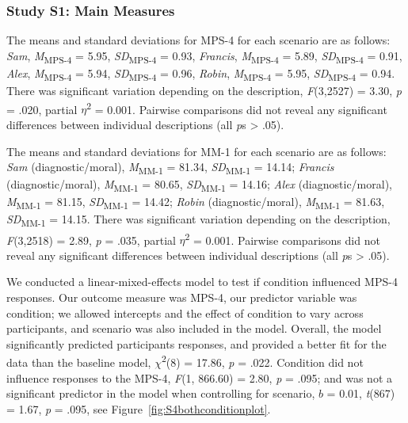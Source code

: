 \documentclass[
  man,floatsintext]{apa6}
\begin{document}
\subsubsection{Study S1: Main Measures}\label{study-s1-main-measures}

The means and standard deviations for MPS-4 for each scenario are as follows:
\emph{Sam},
\emph{M}\textsubscript{MPS-4} = 5.95, \emph{SD}\textsubscript{MPS-4} = 0.93,
\emph{Francis},
\emph{M}\textsubscript{MPS-4} = 5.89, \emph{SD}\textsubscript{MPS-4} = 0.91,
\emph{Alex},
\emph{M}\textsubscript{MPS-4} = 5.94, \emph{SD}\textsubscript{MPS-4} = 0.96,
\emph{Robin},
\emph{M}\textsubscript{MPS-4} = 5.95, \emph{SD}\textsubscript{MPS-4} = 0.94. There was significant variation depending on the description, \emph{F}(3,2527) = 3.30, \emph{p} = .020, partial \(\eta\)\textsuperscript{2} = 0.001. Pairwise comparisons did not reveal any significant differences between individual descriptions (all \emph{p}s \textgreater{} .05).

The means and standard deviations for MM-1 for each scenario are as follows:
\emph{Sam} (diagnostic/moral),
\emph{M}\textsubscript{MM-1} = 81.34, \emph{SD}\textsubscript{MM-1} = 14.14;
\emph{Francis} (diagnostic/moral),
\emph{M}\textsubscript{MM-1} = 80.65, \emph{SD}\textsubscript{MM-1} = 14.16;
\emph{Alex} (diagnostic/moral),
\emph{M}\textsubscript{MM-1} = 81.15, \emph{SD}\textsubscript{MM-1} = 14.42;
\emph{Robin} (diagnostic/moral),
\emph{M}\textsubscript{MM-1} = 81.63, \emph{SD}\textsubscript{MM-1} = 14.15. There was significant variation depending on the description, \emph{F}(3,2518) = 2.89, \emph{p} = .035, partial \(\eta\)\textsuperscript{2} = 0.001. Pairwise comparisons did not reveal any significant differences between individual descriptions (all \emph{p}s \textgreater{} .05).

We conducted a linear-mixed-effects model to test if condition influenced MPS-4 responses. Our outcome measure was MPS-4, our predictor variable was condition; we allowed intercepts and the effect of condition to vary across participants, and scenario was also included in the model.
Overall, the model significantly predicted participants responses, and provided a better fit for the data than the baseline model, \(\chi\)\textsuperscript{2}(8) = 17.86, \emph{p} = .022. Condition did not influence responses to the MPS-4, \emph{F}(1, 866.60) = 2.80, \emph{p} = .095; and was not a significant predictor in the model when controlling for scenario, \(b\) = 0.01, \emph{t}(867) = 1.67, \emph{p} = .095, see Figure~\ref{fig:S4bothconditionplot}.
\end{document}
